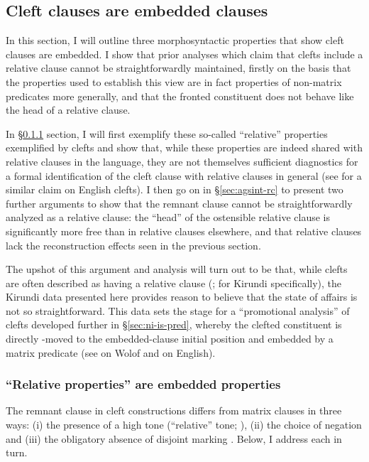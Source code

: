 \documentclass[12pt]{article}
\begin{document}
\subsection{Cleft clauses are embedded clauses} \label{sec:remnant}

In this section, I will outline three morphosyntactic properties that show cleft clauses are embedded. I show that prior analyses which claim that clefts include a relative clause cannot be straightforwardly maintained, firstly on the basis that the properties used to establish this view are in fact properties of non-matrix predicates more generally, and that the fronted constituent does not behave like the head of a relative clause.  

In \S\ref{sec:emb-prop} section, I will first exemplify these so-called ``relative'' properties exemplified by clefts and show that, while these properties are indeed shared with relative clauses in the language, they are not themselves sufficient diagnostics for a formal identification of the cleft clause with relative clauses in general (see \citealt{ekiss-1998} for a similar claim on English clefts). I then go on in \S\ref{sec:agsint-rc} to present two further arguments to show that the remnant clause cannot be straightforwardly analyzed as a relative clause: the ``head'' of the ostensible relative clause is significantly more free than in relative clauses elsewhere, and that relative clauses lack the reconstruction effects seen in  the previous section. 

The upshot of this argument and analysis will turn out to be that, while clefts are often described as having a relative clause (\citealt{akmajian-1970,chomsky-1971,hedberg-2000}; \citealt{lafkioui-et-al-2016} for Kirundi specifically), the Kirundi data presented here provides reason to believe that the state of affairs is not so straightforward. This data sets the stage for a ``promotional analysis'' of clefts developed further in \S\ref{sec:ni-is-pred}, whereby the clefted constituent is directly \abar{}-moved to the embedded-clause initial position and embedded by a matrix predicate (see \citealt{torrence-2013} on Wolof and \citealt{ekiss-1998} on English).

\subsubsection{``Relative properties'' are embedded properties} \label{sec:emb-prop}

The remnant clause in cleft constructions differs from matrix clauses in three ways: (i) the presence of  a high tone (``relative'' tone; \citealt{zorc-nibagwire-2007,lafkioui-et-al-2016}), (ii) the choice of negation \citep{chaperon-batom} and (iii) the obligatory absence of disjoint marking \citep{ndayiragije-1999}. Below, I address each in turn.
\end{document}
